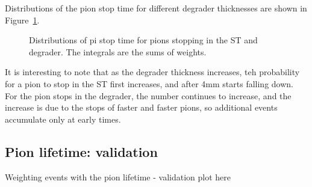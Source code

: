Distributions of the pion stop time for different degrader thicknesses are shown in Figure~\ref{fig:pion_stop_time}.
\begin{figure}[H]
  \caption{
    \label{fig:pion_stop_time}
    Distributions of pi stop time for pions stopping in the ST and degrader. The integrals are the sums of weights.
  }
\end{figure}

It is interesting to note that as the degrader thickness increases, teh probability for a pion to stop
in the ST first increases, and after 4mm starts falling down. 
For the pion stops in the degrader, the number continues to increase, and the increase is due
to the stops of faster and faster pions, so additional events accumulate only at early times.

\subsection {Pion lifetime: validation}

Weighting events with the pion lifetime - validation plot here

\begin{figure}[H]
  \caption{
    \label{fig:pion_lifetime}
  }
\end{figure}


